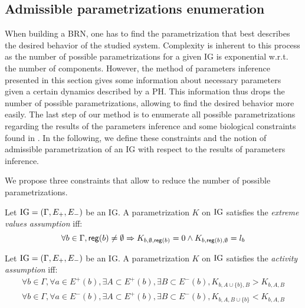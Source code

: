 \subsection{Admissible parametrizations enumeration}
When building a BRN, one has to find the parametrization that best describes the desired behavior of the studied system. Complexity is inherent to this process as the number of possible parametrizations for a given IG is exponential w.r.t. the number of components. However, the method of parameters inference presented in this section gives some information about necessary parameters given a certain dynamics described by a PH. This information thus drops the number of possible parametrizations, allowing to find the desired behavior more easily. The last step of our method is to enumerate all possible parametrizations regarding the results of the parameters inference and some biological constraints found in \cite{BernotSemBRN}. In the following, we define these constraints and the notion of admissible parametrization of an IG with respect to the results of parameters inference.

We propose three constraints that allow to reduce the number of possible parametrizations.

\begin{property}
Let $\mathrm{IG} = (\Gamma, E_+, E_-)$ be an IG. A parametrization $K$ on $\mathrm{IG}$ satisfies the \emph{extreme values assumption} iff:
\label{prop:param_enum_extreme}
\[
  \forall b \in \Gamma, \mathsf{reg}({b}) \neq \emptyset \Rightarrow K_{b,\emptyset,\mathsf{reg}({b})} = 0 \wedge K_{b,\mathsf{reg}({b}),\emptyset} = l_b
\]
\end{property}

\begin{property}
\label{prop:param_enum_activity}
Let $\mathrm{IG} = (\Gamma, E_+, E_-)$ be an IG. A parametrization $K$ on $\mathrm{IG}$ satisfies the \emph{activity assumption} iff:
\begin{align*}
  \forall b \in \Gamma, \forall a \in E^+(b), \exists A \subset E^+(b), \exists B \subset E^-(b),
    K_{b,A \cup \{b\},B} > K_{b,A,B}
\\
  \forall b \in \Gamma, \forall a \in E^-(b), \exists A \subset E^+(b), \exists B \subset E^-(b),
    K_{b,A,B \cup \{b\}} < K_{b,A,B}
\end{align*}
\end{property}

